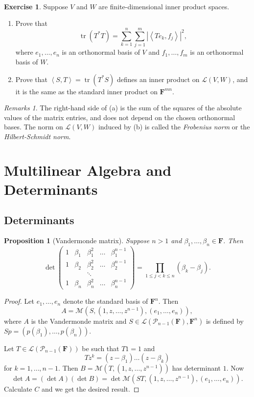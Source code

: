 \documentclass[nofonts,colorlinks]{tufte-handout}
\theoremstyle{plain} %
\newtheorem{prop}[thm]{Proposition}
\theoremstyle{definition}
\newtheorem{exer}[thm]{Exercise}
\theoremstyle{remark}
\newtheorem{rmks}[thm]{Remarks}
\newcommand{\inp}[2]{\mathopen{}\left\langle#1,#2\right\rangle}
\newcommand{\abs}[1]{\mathopen{}\left|#1\right|}
\newcommand{\F}{\mathbf{F}}
\renewcommand{\L}{\mathcal{L}}
\newcommand{\M}{\mathcal{M}}
\renewcommand{\P}{\mathcal{P}}
\DeclareMathOperator{\tr}{tr}
\begin{document}
\begin{exer}
	Suppose $V$ and $W$ are finite-dimensional inner product spaces.
	\begin{enumerate}
		\item Prove that
		\[\tr(T^*T)=\sum_{k=1}^{n}\sum_{j=1}^{m}\abs{\inp{Te_k}{f_j}}^2,\]
		where $e_1,\dots,e_n$ is an orthonormal basis of $V$ and $f_1,\dots,f_m$ is an orthonormal basis of $W$.
		\item Prove that $\inp{S}{T}=\tr(T^*S)$ defines an inner product on $\L(V,W)$, and it is the same as the standard inner product on $\F^{mn}$.
	\end{enumerate}
\end{exer}
\begin{rmks}
	The right-hand side of (a) is the sum of the squares of the absolute values of the matrix entries, and does not depend on the chosen orthonormal bases. The norm on $\L(V,W)$ induced by (b) is called the \emph{Frobenius norm} or the \emph{Hilbert-Schmidt norm}.
\end{rmks}


\section{Multilinear Algebra and Determinants}
\subsection{Determinants}
\begin{prop}[Vandermonde matrix]
	Suppose $n>1$ and $\beta_1,\dots,\beta_n\in\F$. Then
	\[\det\begin{pmatrix}
		1&\beta_1&\beta_1^2&\dots&\beta_1^{n-1}\\
		1&\beta_2&\beta_2^2&\dots&\beta_2^{n-1}\\
		&&\ddots&&\\
		1&\beta_n&\beta_n^2&\dots&\beta_n^{n-1}
	\end{pmatrix}=\prod_{1\leq j<k\leq n}(\beta_k-\beta_j).\]
\end{prop}
\begin{proof}
	Let $e_1,\dots,e_n$ denote the standard basis of $\F^n$. Then
	\[A=\M(S,(1,z,\dots,z^{n-1}),(e_1,\dots,e_n)),\]
	where $A$ is the Vandermonde matrix and $S\in\L(\P_{n-1}(\F),\F^n)$ is defined by $Sp=(p(\beta_1),\dots,p(\beta_n))$.

	Let $T\in\L(\P_{n-1}(\F))$ be such that $T1=1$ and
	\[Tz^k=(z-\beta_1)\dots(z-\beta_k)\]
	for $k=1,\dots,n-1$. Then $B=\M(T,(1,z,\dots,z^{n-1}))$ has determinant $1$. Now
	\[\det A=(\det A)(\det B)=\det\M(ST,(1,z,\dots,z^{n-1}),(e_1,\dots,e_n)).\]
	Calculate $C$ and we get the desired result.
\end{proof}
\end{document}
